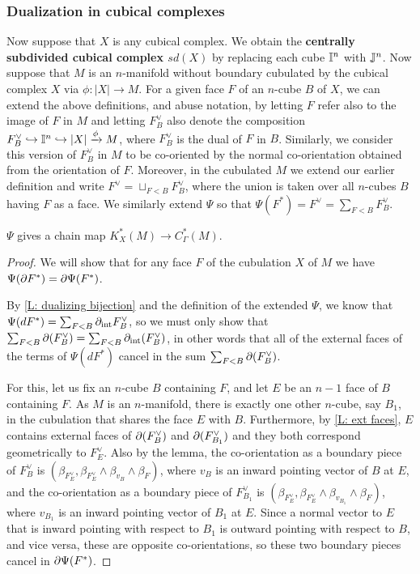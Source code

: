 \subsubsection{Dualization in cubical complexes}

Now suppose that $X$ is any cubical complex. We obtain the \textbf{centrally subdivided cubical complex $sd(X)$} by replacing each cube $\mathbb{I}^n$ with $\mathbb{J}^n$.
Now suppose that $M$ is an $n$-manifold without boundary cubulated by the cubical complex $X$ via $\phi:|X| \to M$. For a given face $F$ of an $n$-cube $B$ of $X$, we can extend the above definitions, and abuse notation, by letting $F$ refer also to the image of $F$ in $M$ and letting $F_B^\vee$ also denote the composition $F_B^\vee \hookrightarrow \mathbb{I}^n \hookrightarrow |X| \xrightarrow{\phi} M$, where $F_B^\vee$ is the dual of $F$ in $B$. Similarly, we consider this version of $F_B^\vee$ in $M$ to be co-oriented by the normal co-orientation obtained from the orientation of $F$. Moreover, in the cubulated $M$ we extend our earlier definition and write $F^\vee = \sqcup_{F<B} F^\vee_B$, where the union is taken over all $n$-cubes $B$ having $F$ as a face.
We similarly extend $\Psi$ so that $\Psi(F^*) = F^\vee = \sum_{F<B} F_{B}^\vee$.

\begin{lemma}\label{L: dual chain map}
$\Psi$ gives a chain map $K_X^*(M) \to C_\Gamma^*(M)$.
\end{lemma}
\begin{proof}
We will show that for any face $F$ of the cubulation $X$ of $M$ we have $\Psi(\partial F^*) = \partial\Psi(F^*)$.

By \cref{L: dualizing bijection} and the definition of the extended $\Psi$, we know that $\Psi(dF^*) = \sum_{F<B} \partial_{\text{int}}F^\vee_B$, so we must only show that $\sum_{F<B} \partial (F^\vee_B) = \sum_{F<B} \partial_{\text{int}}(F^\vee_B)$, in other words that all of the external faces of the terms of $\Psi(dF^*)$ cancel in the sum $\sum_{F<B} \partial (F^\vee_B)$.

For this, let us fix an $n$-cube $B$ containing $F$, and let $E$ be an $n-1$ face of $B$ containing $F$. As $M$ is an $n$-manifold, there is exactly one other $n$-cube, say $B_1$, in the cubulation that shares the face $E$ with $B$. Furthermore, by \cref{L: ext faces}, $E$ contains external faces of $\partial(F^\vee_B)$ and $\partial(F^\vee_{B_1})$ and they both correspond geometrically to $F^\vee_E$. Also by the lemma, the co-orientation as a boundary piece of $F^\vee_B$ is $(\beta_{F_E^\vee},\beta_{F_E^\vee}\wedge\beta_{v_B} \wedge \beta_F)$, where $v_B$ is an inward pointing vector of $B$ at $E$, and the co-orientation as a boundary piece of $F^\vee_{B_1}$ is $(\beta_{F_E^\vee},\beta_{F_E^\vee}\wedge\beta_{v_{B_1}} \wedge \beta_F)$, where $v_{B_1}$ is an inward pointing vector of $B_1$ at $E$. Since a normal vector to $E$ that is inward pointing with respect to $B_1$ is outward pointing with respect to $B$, and vice versa, these are opposite co-orientations, so these two boundary pieces cancel in $\partial \Psi(F^*)$.
\end{proof}

